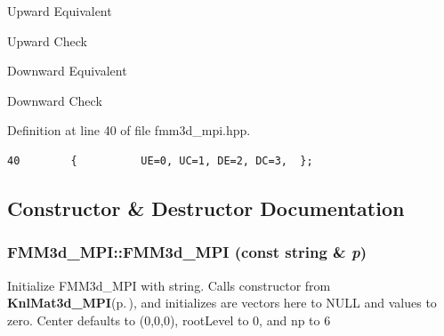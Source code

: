 \begin{Desc}
\item[Enumerator: ]\par
\begin{description}
\item[{\em 
UE\label{classFMM3d__MPI_dca29a1140aadadfd92b34a02fa516ef_dca29a1140aadadfd92b34a02fa516ef0612e93d65abcdaeed533a0876474251}
}]Upward Equivalent \item[{\em 
UC\label{classFMM3d__MPI_dca29a1140aadadfd92b34a02fa516ef_dca29a1140aadadfd92b34a02fa516ef6a2fb30a2dacdda4d74122697262a8b7}
}]Upward Check \item[{\em 
DE\label{classFMM3d__MPI_dca29a1140aadadfd92b34a02fa516ef_dca29a1140aadadfd92b34a02fa516ef3a52f3c22ed6fcde5bf696a6c02c9e73}
}]Downward Equivalent \item[{\em 
DC\label{classFMM3d__MPI_dca29a1140aadadfd92b34a02fa516ef_dca29a1140aadadfd92b34a02fa516efcf75e54791dd1f49f918345fdfe2430b}
}]Downward Check \end{description}
\end{Desc}



Definition at line 40 of file fmm3d\_\-mpi.hpp.

\footnotesize\begin{verbatim}40        {          UE=0, UC=1, DE=2, DC=3,  };
\end{verbatim}\normalsize 




\subsection{Constructor \& Destructor Documentation}
\subsubsection{\setlength{\rightskip}{0pt plus 5cm}FMM3d\_\-MPI::FMM3d\_\-MPI (const string \& {\em p})}\label{classFMM3d__MPI_9f48ad5b4ec95878d1bb32a181525789_9f48ad5b4ec95878d1bb32a181525789}


Initialize FMM3d\_\-MPI with string. Calls constructor from {\bf Knl\-Mat3d\_\-MPI}{\rm (p.\,\pageref{classKnlMat3d__MPI})}, and initializes are vectors here to NULL and values to zero. Center defaults to (0,0,0), root\-Level to 0, and np to 6 

